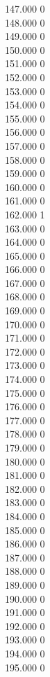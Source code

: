 { 147.000	0 \\
 148.000	0 \\
 149.000	0 \\
 150.000	0 \\
 151.000	0 \\
 152.000	0 \\
 153.000	0 \\
 154.000	0 \\
 155.000	0 \\
 156.000	0 \\
 157.000	0 \\
 158.000	0 \\
 159.000	0 \\
 160.000	0 \\
 161.000	0 \\
 162.000	1 \\
 163.000	0 \\
 164.000	0 \\
 165.000	0 \\
 166.000	0 \\
 167.000	0 \\
 168.000	0 \\
 169.000	0 \\
 170.000	0 \\
 171.000	0 \\
 172.000	0 \\
 173.000	0 \\
 174.000	0 \\
 175.000	0 \\
 176.000	0 \\
 177.000	0 \\
 178.000	0 \\
 179.000	0 \\
 180.000	0 \\
 181.000	0 \\
 182.000	0 \\
 183.000	0 \\
 184.000	0 \\
 185.000	0 \\
 186.000	0 \\
 187.000	0 \\
 188.000	0 \\
 189.000	0 \\
 190.000	0 \\
 191.000	0 \\
 192.000	0 \\
 193.000	0 \\
 194.000	0 \\
 195.000	0 \\
}
